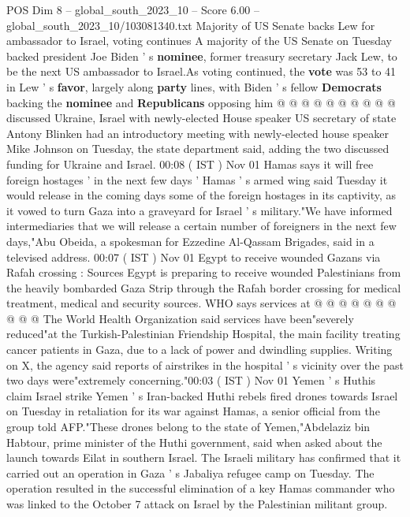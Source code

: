 \begin{textsample}{POS Dim 8 – global\_south\_2023\_10 – Score 6.00 – global\_south\_2023\_10/103081340.txt}
Majority of US Senate backs Lew for ambassador to Israel, voting continues A majority of the US Senate on Tuesday backed president Joe Biden ' s \textbf{nominee}, former treasury secretary Jack Lew, to be the next US ambassador to Israel.As voting continued, the \textbf{vote} was 53 to 41 in Lew ' s \textbf{favor}, largely along \textbf{party} lines, with Biden ' s fellow \textbf{Democrats} backing the \textbf{nominee} and \textbf{Republicans} opposing him @ @ @ @ @ @ @ @ @ @ discussed Ukraine, Israel with newly-elected House speaker US secretary of state Antony Blinken had an introductory meeting with newly-elected house speaker Mike Johnson on Tuesday, the state department said, adding the two discussed funding for Ukraine and Israel. 00:08 ( IST ) Nov 01 Hamas says it will free foreign hostages ' in the next few days ' Hamas ' s armed wing said Tuesday it would release in the coming days some of the foreign hostages in its captivity, as it vowed to turn Gaza into a graveyard for Israel ' s military."We have informed intermediaries that we will release a certain number of foreigners in the next few days,"Abu Obeida, a spokesman for Ezzedine Al-Qassam Brigades, said in a televised address. 00:07 ( IST ) Nov 01 Egypt to receive wounded Gazans via Rafah crossing : Sources Egypt is preparing to receive wounded Palestinians from the heavily bombarded Gaza Strip through the Rafah border crossing for medical treatment, medical and security sources.
WHO says services at @ @ @ @ @ @ @ @ @ @ The World Health Organization said services have been"severely reduced"at the Turkish-Palestinian Friendship Hospital, the main facility treating cancer patients in Gaza, due to a lack of power and dwindling supplies.
Writing on X, the agency said reports of airstrikes in the hospital ' s vicinity over the past two days were"extremely concerning."00:03 ( IST ) Nov 01 Yemen ' s Huthis claim Israel strike Yemen ' s Iran-backed Huthi rebels fired drones towards Israel on Tuesday in retaliation for its war against Hamas, a senior official from the group told AFP."These drones belong to the state of Yemen,"Abdelaziz bin Habtour, prime minister of the Huthi government, said when asked about the launch towards Eilat in southern Israel.
The Israeli military has confirmed that it carried out an operation in Gaza ' s Jabaliya refugee camp on Tuesday.
The operation resulted in the successful elimination of a key Hamas commander who was linked to the October 7 attack on Israel by the Palestinian militant group.

\end{textsample}
